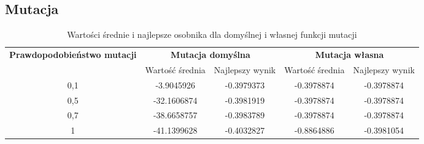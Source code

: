 \subsection{Mutacja}

\begin{table}[!h]
	\centering
	\caption{Wartości średnie i najlepsze osobnika dla domyślnej i własnej funkcji mutacji}
	\label{wyniki_klasyf}
	\begin{tabular}{|c|c|c|c|c|}
		\hline
		\multirow{2}{*}{\textbf{Prawdopodobieństwo mutacji}}
		  & \multicolumn{2}{c}{\textbf{Mutacja domyślna}}  & \multicolumn{2}{|c|}{\textbf{Mutacja własna}} \\ \cline{2-5}
		& Wartość średnia & Najlepszy wynik & Wartość średnia & Najlepszy wynik \\ \hline
		
		0,1 & -3.9045926 & -0.3979373  & -0.3978874 & -0.3978874  \\
		0,5 & -32.1606874 & -0.3981919 & -0.3978874 & -0.3978874 \\
		0,7 & -38.6658757 & -0.3983789 & -0.3978874 & -0.3978874  \\
		1 & -41.1399628 & -0.4032827 & -0.8864886 & -0.3981054 \\ \hline      
	\end{tabular}
\end{table}